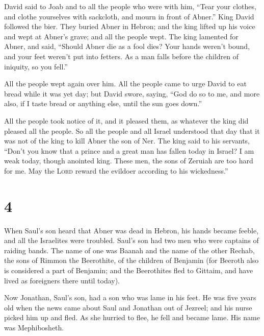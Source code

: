  David said to Joab and to all the people who were with
him, ``Tear your clothes, and clothe yourselves with sackcloth, and
mourn in front of Abner.'' King David followed the bier. 
They buried Abner in Hebron; and the king lifted up his voice and wept
at Abner's grave; and all the people wept.  The king
lamented for Abner, and said, ``Should Abner die as a fool dies?
 Your hands weren't bound, and your feet weren't put into
fetters. As a man falls before the children of iniquity, so you fell.''

All the people wept again over him.  All the people came
to urge David to eat bread while it was yet day; but David swore,
saying, ``God do so to me, and more also, if I taste bread or anything
else, until the sun goes down.''

 All the people took notice of it, and it pleased them,
as whatever the king did pleased all the people.  So all
the people and all Israel understood that day that it was not of the
king to kill Abner the son of Ner.  The king said to his
servants, ``Don't you know that a prince and a great man has fallen
today in Israel?  I am weak today, though anointed king.
These men, the sons of Zeruiah are too hard for me. May the
\textsc{Lord} reward the evildoer according to his wickedness.''

\hypertarget{section-3}{%
\section{4}\label{section-3}}

 When Saul's son heard that Abner was dead in Hebron, his
hands became feeble, and all the Israelites were troubled.
 Saul's son had two men who were captains of raiding
bands. The name of one was Baanah and the name of the other Rechab, the
sons of Rimmon the Beerothite, of the children of Benjamin (for Beeroth
also is considered a part of Benjamin;  and the
Beerothites fled to Gittaim, and have lived as foreigners there until
today).

 Now Jonathan, Saul's son, had a son who was lame in his
feet. He was five years old when the news came about Saul and Jonathan
out of Jezreel; and his nurse picked him up and fled. As she hurried to
flee, he fell and became lame. His name was Mephibosheth.

